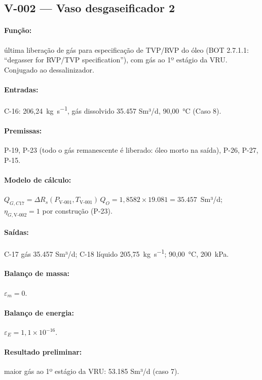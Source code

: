 \documentclass[11pt,a4paper]{article}
\numberwithin{equation}{section}
\numberwithin{table}{section}
\numberwithin{figure}{section}
\begin{document}
\subsection{V-002 --- Vaso desgaseificador 2}
\paragraph{Função:} última liberação de gás para especificação de TVP/RVP do óleo (BOT 2.7.1.1: ``degasser for RVP/TVP specification''), com gás ao 1º estágio da VRU. Conjugado ao dessalinizador.
\paragraph{Entradas:} C-16: 206,24~\si{\kilogram\per\second}, gás dissolvido 35.457 Sm³/d, 90,00~\si{\celsius} (Caso 8).
\paragraph{Premissas:} P-19, P-23 (todo o gás remanescente é liberado: óleo morto na saída), P-26, P-27, P-15.
\paragraph{Modelo de cálculo:} $Q_{G,C17}=\Delta R_s(P_{\mbox{V-001}},T_{\mbox{V-001}})\,Q_O=1{,}8582\times19.081=35.457$~Sm³/d; $\eta_{G,\mbox{V-002}}=1$ por construção (P-23).

\paragraph{Saídas:} C-17 gás 35.457 Sm³/d; C-18 líquido 205,75~\si{\kilogram\per\second}; 90,00~\si{\celsius}, 200~\si{\kilo\pascal}.
\paragraph{Balanço de massa:} $\varepsilon_m=$$0$.
\paragraph{Balanço de energia:} $\varepsilon_E=$$1{,}1\times10^{-16}$.
\paragraph{Resultado preliminar:} maior gás ao 1º estágio da VRU: 53.185 Sm³/d (caso 7).
\end{document}
